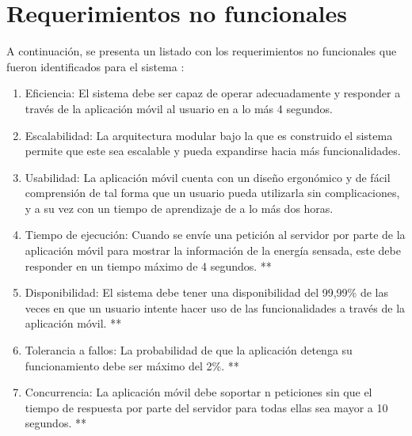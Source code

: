 \section{Requerimientos no funcionales}
A continuación, se presenta un listado con los requerimientos no funcionales \citep{RNF1} que fueron identificados para el sistema :
\begin{enumerate}[label=RNF\arabic*.]
    \item Eficiencia: El sistema debe ser capaz de operar adecuadamente y responder a través de la aplicación móvil al usuario en a lo más 4 segundos.
	
	\item Escalabilidad: La arquitectura modular bajo la que es construido el sistema permite que este sea escalable y pueda expandirse hacia más funcionalidades.
	
	\item Usabilidad: La aplicación móvil cuenta con un diseño ergonómico y de fácil comprensión de tal forma que un usuario pueda utilizarla sin complicaciones, y a su vez con un tiempo de aprendizaje de a lo más dos horas.
	\item Tiempo de ejecución: Cuando se envíe una petición al servidor por parte de la aplicación móvil para mostrar la información de la energía sensada, este debe responder en un tiempo máximo de 4 segundos. **
	\item Disponibilidad: El sistema debe tener una disponibilidad del 99,99\% de las veces en que un usuario intente hacer uso de las funcionalidades a través de la aplicación móvil. **
	\item Tolerancia a fallos: La probabilidad de que la aplicación detenga su funcionamiento debe ser máximo del 2\%. **
	\item Concurrencia: La aplicación móvil debe soportar n peticiones sin que el tiempo de respuesta por parte del servidor para todas ellas sea mayor a 10 segundos. **
\end{enumerate}